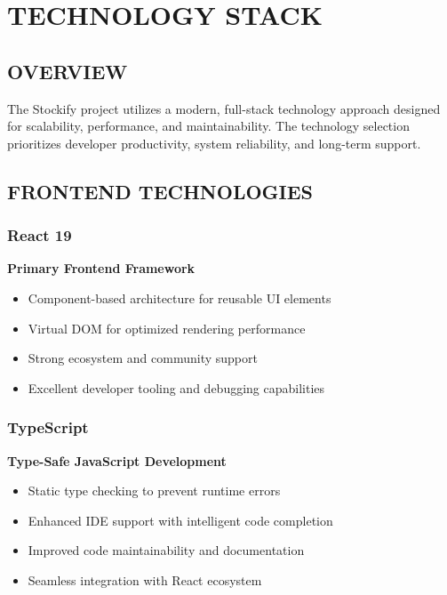 \chapter{TECHNOLOGY STACK}

\section{OVERVIEW}

The Stockify project utilizes a modern, full-stack technology approach designed for scalability, performance, and maintainability. The technology selection prioritizes developer productivity, system reliability, and long-term support.

\section{FRONTEND TECHNOLOGIES}

\subsection{React 19}

\textbf{Primary Frontend Framework}

\begin{itemize}
\item Component-based architecture for reusable UI elements
\item Virtual DOM for optimized rendering performance
\item Strong ecosystem and community support
\item Excellent developer tooling and debugging capabilities
\end{itemize}

\subsection{TypeScript}

\textbf{Type-Safe JavaScript Development}

\begin{itemize}
\item Static type checking to prevent runtime errors
\item Enhanced IDE support with intelligent code completion
\item Improved code maintainability and documentation
\item Seamless integration with React ecosystem
\end{itemize}

